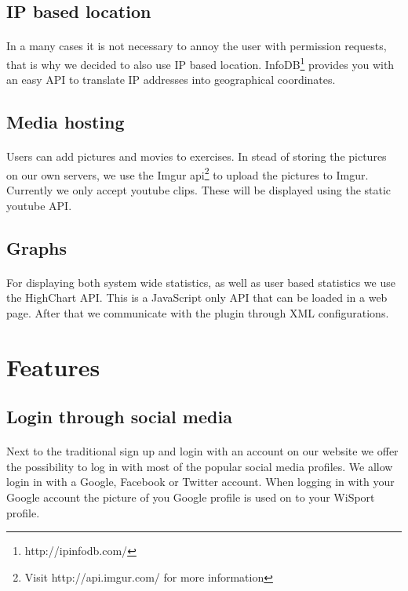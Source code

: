 \documentclass[11pt,a4paper]{scrartcl}
\begin{document}
\subsection{IP based location}
\paragraph{}In a many cases it is not necessary to annoy the user with permission requests, that is why we decided to also use IP based location. InfoDB\footnote{http://ipinfodb.com/} provides you with an easy API to translate IP addresses into geographical coordinates.
\subsection{Media hosting}
\paragraph{}Users can add pictures and movies to exercises. In stead of storing the pictures on our own servers, we use the Imgur api\footnote{Visit http://api.imgur.com/ for more information} to upload the pictures to Imgur. Currently we only accept youtube clips. These will be displayed using the static youtube API.
\subsection{Graphs}
\paragraph{}For displaying both system wide statistics, as well as user based statistics we use the HighChart API. This is a JavaScript only API that can be loaded in a web page. After that we communicate with the plugin through XML configurations.

\section{Features}
\subsection{Login through social media}
\paragraph{}Next to the traditional sign up and login with an account on our website we offer the possibility to log in with most of the popular social media profiles. We allow login in  with a Google, Facebook or Twitter account. When logging in with your Google account the picture of you Google profile is used on to your WiSport profile.
\end{document}
